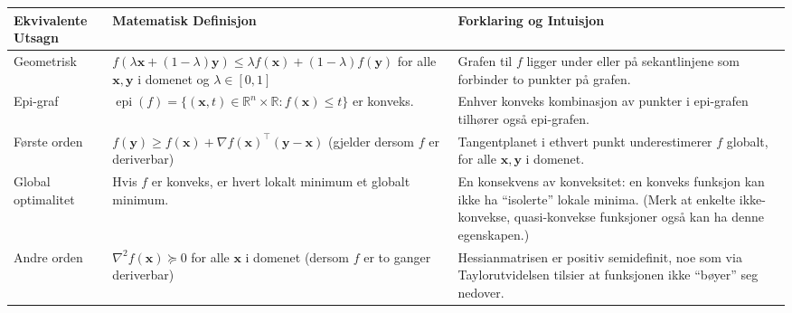 \begin{table}[H]
	\centering
	\small
	\setlength{\tabcolsep}{6pt}
	\begin{tabularx}{\textwidth}{|>{\raggedright\arraybackslash}X|>{\raggedright\arraybackslash}X|>{\raggedright\arraybackslash}X|}
		\rowcolor{rem-color!25}
		\textbf{Ekvivalente Utsagn} & \textbf{Matematisk Definisjon}                                                                                                                                                     & \textbf{Forklaring og Intuisjon} \\
		\hline
		Geometrisk                  &
		\( f(\lambda \symbf{x} + (1-\lambda)\symbf{y}) \le \lambda f(\symbf{x}) + (1-\lambda)f(\symbf{y}) \)
		for alle \( \symbf{x},\symbf{y} \) i domenet og \( \lambda \in [0,1] \)
		                            & Grafen til \( f \) ligger under eller på sekantlinjene som forbinder to punkter på grafen.                                                                                                                            \\
		\hline
		Epi-graf                    &
		\(\operatorname{epi}(f) = \{ (\symbf{x},t)\in\mathbb{R}^n\times\mathbb{R} : f(\symbf{x})\le t \}\) er konveks.
		                            & Enhver konveks kombinasjon av punkter i epi-grafen tilhører også epi-grafen.                                                                                                                                          \\
		\hline
		Første orden                &
		\( f(\symbf{y}) \ge f(\symbf{x}) + \nabla f(\symbf{x})^\top (\symbf{y}-\symbf{x}) \)
		(gjelder dersom \( f \) er deriverbar)
		                            & Tangentplanet i ethvert punkt underestimerer \( f \) globalt, for alle \( \symbf{x},\symbf{y} \) i domenet.                                                                                                           \\
		\hline
		Global optimalitet          &
		Hvis \( f \) er konveks, er hvert lokalt minimum et globalt minimum.
		                            & En konsekvens av konveksitet: en konveks funksjon kan ikke ha ``isolerte'' lokale minima. (Merk at enkelte ikke-konvekse, quasi-konvekse funksjoner også kan ha denne egenskapen.)                                    \\\hline
		Andre orden                 &
		\( \nabla^2 f(\symbf{x}) \succeq 0 \) for alle \( \symbf{x} \) i domenet
		(dersom \( f \) er to ganger deriverbar)
		                            & Hessianmatrisen er positiv semidefinit, noe som via Taylorutvidelsen tilsier at funksjonen ikke ``bøyer'' seg nedover.                                                                                                \\

\end{tabularx}
\end{table}
